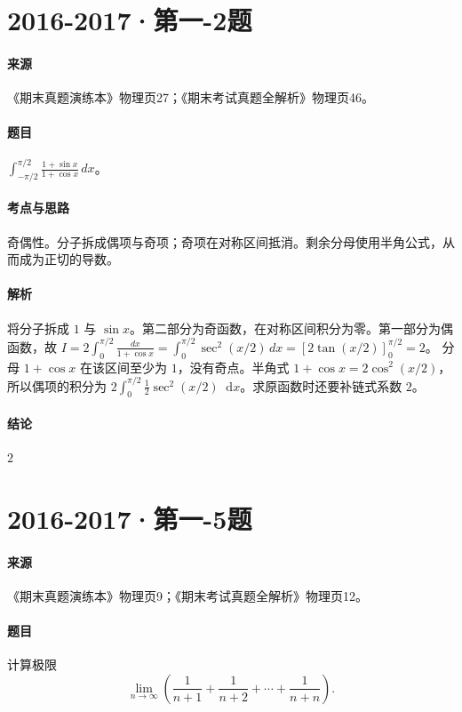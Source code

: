 \documentclass[UTF8,fontset=fandol,12pt,oneside,openany]{ctexrep}
\newcommand{\dd}{\mathop{}\!\mathrm d}
\theoremstyle{definition}
\begin{document}
\par\addvspace{18pt}\noindent\begin{minipage}{\linewidth}
\section{2016-2017·第一-2题}
\label{exam:11:q28}
\paragraph{来源} 《期末真题演练本》物理页27；《期末考试真题全解析》物理页46。
\paragraph{题目}
$\int_{-\pi/2}^{\pi/2}\frac{1+\sin x}{1+\cos x}\,dx$。
\end{minipage}\par
\paragraph{考点与思路}
奇偶性。分子拆成偶项与奇项；奇项在对称区间抵消。剩余分母使用半角公式，从而成为正切的导数。
\paragraph{解析}
将分子拆成 $1$ 与 $\sin x$。第二部分为奇函数，在对称区间积分为零。第一部分为偶函数，故 $I=2\int_0^{\pi/2}\frac{dx}{1+\cos x}=\int_0^{\pi/2}\sec^2(x/2)\,dx=[2\tan(x/2)]_0^{\pi/2}=2$。
分母 $1+\cos x$ 在该区间至少为 $1$，没有奇点。半角式 $1+\cos x=2\cos^2(x/2)$，所以偶项的积分为 $2\int_0^{\pi/2}\frac12\sec^2(x/2)\dd x$。求原函数时还要补链式系数 $2$。
\paragraph{结论}
$2$

\par\addvspace{18pt}\noindent\begin{minipage}{\linewidth}
\section{2016-2017·第一-5题}
\label{exam:11:q29}
\paragraph{来源} 《期末真题演练本》物理页9；《期末考试真题全解析》物理页12。
\paragraph{题目}
计算极限 \[\lim_{n\to\infty}\left(\frac1{n+1}+\frac1{n+2}+\cdots+\frac1{n+n}\right).\]
\end{minipage}\par
\end{document}
